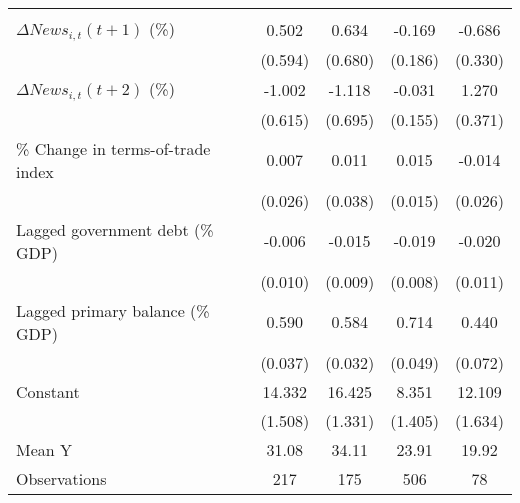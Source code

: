 {\begin{tabular}{l*{4}{c}}
                    &                     &                     &                     &                     \\
\addlinespace
$ \Delta News_{i,t}(t+1)$ (\%)&       0.502         &       0.634         &      -0.169         &      -0.686\sym{*}  \\
                    &     (0.594)         &     (0.680)         &     (0.186)         &     (0.330)         \\
\addlinespace
$ \Delta News_{i,t}(t+2)$ (\%)&      -1.002         &      -1.118         &      -0.031         &       1.270\sym{***}\\
                    &     (0.615)         &     (0.695)         &     (0.155)         &     (0.371)         \\
\addlinespace
\% Change in terms-of-trade index&       0.007         &       0.011         &       0.015         &      -0.014         \\
                    &     (0.026)         &     (0.038)         &     (0.015)         &     (0.026)         \\
\addlinespace
Lagged government debt (\% GDP)&      -0.006         &      -0.015         &      -0.019\sym{**} &      -0.020\sym{*}  \\
                    &     (0.010)         &     (0.009)         &     (0.008)         &     (0.011)         \\
\addlinespace
Lagged primary balance (\% GDP)&       0.590\sym{***}&       0.584\sym{***}&       0.714\sym{***}&       0.440\sym{***}\\
                    &     (0.037)         &     (0.032)         &     (0.049)         &     (0.072)         \\
\addlinespace
Constant            &      14.332\sym{***}&      16.425\sym{***}&       8.351\sym{***}&      12.109\sym{***}\\
                    &     (1.508)         &     (1.331)         &     (1.405)         &     (1.634)         \\
\midrule
Mean Y              &       31.08         &       34.11         &       23.91         &       19.92         \\
Observations        &         217         &         175         &         506         &          78         \\
\bottomrule
\end{tabular}
}
